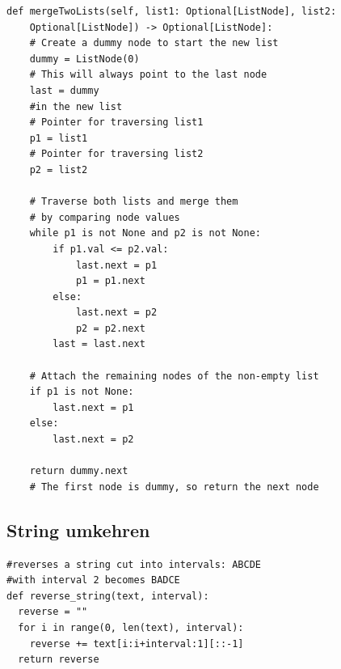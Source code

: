 \begin{codebox}
\begin{lstlisting}[style=CodeExpert]
    def mergeTwoLists(self, list1: Optional[ListNode], list2:
    Optional[ListNode]) -> Optional[ListNode]:
    # Create a dummy node to start the new list
    dummy = ListNode(0)
    # This will always point to the last node
    last = dummy
    #in the new list
    # Pointer for traversing list1
    p1 = list1
    # Pointer for traversing list2
    p2 = list2

    # Traverse both lists and merge them
    # by comparing node values
    while p1 is not None and p2 is not None:
        if p1.val <= p2.val:
            last.next = p1
            p1 = p1.next
        else:
            last.next = p2
            p2 = p2.next
        last = last.next

    # Attach the remaining nodes of the non-empty list
    if p1 is not None:
        last.next = p1
    else:
        last.next = p2

    return dummy.next
    # The first node is dummy, so return the next node
\end{lstlisting}
\end{codebox}


\subsection{String umkehren}\label{sec:12-string-umkehren}

\begin{codebox}
\begin{lstlisting}[style=CodeExpert]
#reverses a string cut into intervals: ABCDE
#with interval 2 becomes BADCE
def reverse_string(text, interval):
  reverse = ""
  for i in range(0, len(text), interval):
    reverse += text[i:i+interval:1][::-1]
  return reverse

\end{lstlisting}
\end{codebox}
